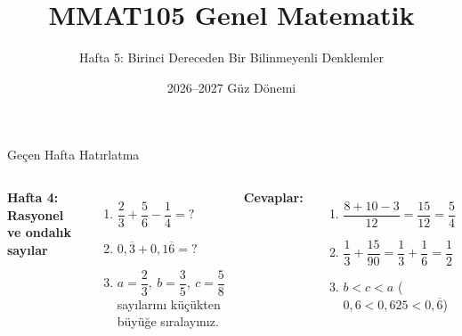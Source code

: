 \documentclass[aspectratio=169,11pt,handout]{beamer}
\title[MMAT105 -- Hafta 5]{MMAT105 Genel Matematik}
\subtitle{Hafta 5: Birinci Dereceden Bir Bilinmeyenli Denklemler}
\author{}
\date{2026--2027 Güz Dönemi}
\begin{document}
\begin{frame}
\titlepage
\end{frame}


\begin{frame}{Geçen Hafta Hatırlatma}
\begin{columns}[t]
\textbf{Hafta 4: Rasyonel ve ondalık sayılar}
\begin{enumerate}
\item \(\dfrac{2}{3}+\dfrac{5}{6}-\dfrac{1}{4}=?\)\\[4pt]
\item \(0{,}\overline{3}+0{,}1\overline{6}=?\)\\[4pt]
\item \(a=\dfrac{2}{3},\ b=\dfrac{3}{5},\ c=\dfrac{5}{8}\) sayılarını küçükten büyüğe sıralayınız.
\end{enumerate}
\pause
\textbf{Cevaplar:}
\begin{enumerate}
\item \(\dfrac{8+10-3}{12}=\dfrac{15}{12}=\dfrac{5}{4}\)\\[4pt]
\item \(\dfrac{1}{3}+\dfrac{15}{90}=\dfrac{1}{3}+\dfrac{1}{6}=\dfrac{1}{2}\)\\[4pt]
\item \(b<c<a\) \quad (\(0{,}6<0{,}625<0{,}\overline{6}\))
\end{enumerate}
\end{columns}
\end{frame}
\end{document}
